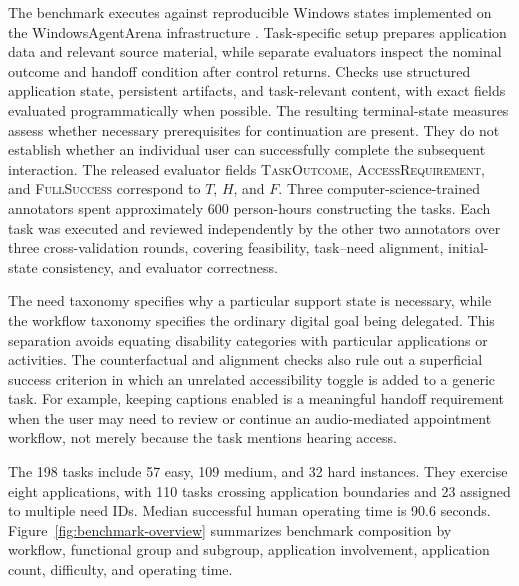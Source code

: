 \documentclass[11pt]{article}
\newcommand{\taskout}{\textsc{TaskOutcome}\xspace}
\newcommand{\accessreq}{\textsc{AccessRequirement}\xspace}
\newcommand{\fullsuccess}{\textsc{FullSuccess}\xspace}
\begin{document}
The benchmark executes against reproducible Windows states implemented on the WindowsAgentArena infrastructure \citep{waa}. Task-specific setup prepares application data and relevant source material, while separate evaluators inspect the nominal outcome and handoff condition after control returns. Checks use structured application state, persistent artifacts, and task-relevant content, with exact fields evaluated programmatically when possible. The resulting terminal-state measures assess whether necessary prerequisites for continuation are present. They do not establish whether an individual user can successfully complete the subsequent interaction. The released evaluator fields \taskout, \accessreq, and \fullsuccess correspond to $T$, $H$, and $F$. Three computer-science-trained annotators spent approximately 600 person-hours constructing the tasks. Each task was executed and reviewed independently by the other two annotators over three cross-validation rounds, covering feasibility, task--need alignment, initial-state consistency, and evaluator correctness.

The need taxonomy specifies why a particular support state is necessary, while the workflow taxonomy specifies the ordinary digital goal being delegated. This separation avoids equating disability categories with particular applications or activities. The counterfactual and alignment checks also rule out a superficial success criterion in which an unrelated accessibility toggle is added to a generic task. For example, keeping captions enabled is a meaningful handoff requirement when the user may need to review or continue an audio-mediated appointment workflow, not merely because the task mentions hearing access.

The 198 tasks include 57 easy, 109 medium, and 32 hard instances. They exercise eight applications, with 110 tasks crossing application boundaries and 23 assigned to multiple need IDs. Median successful human operating time is 90.6 seconds. Figure~\ref{fig:benchmark-overview} summarizes benchmark composition by workflow, functional group and subgroup, application involvement, application count, difficulty, and operating time.
\end{document}
